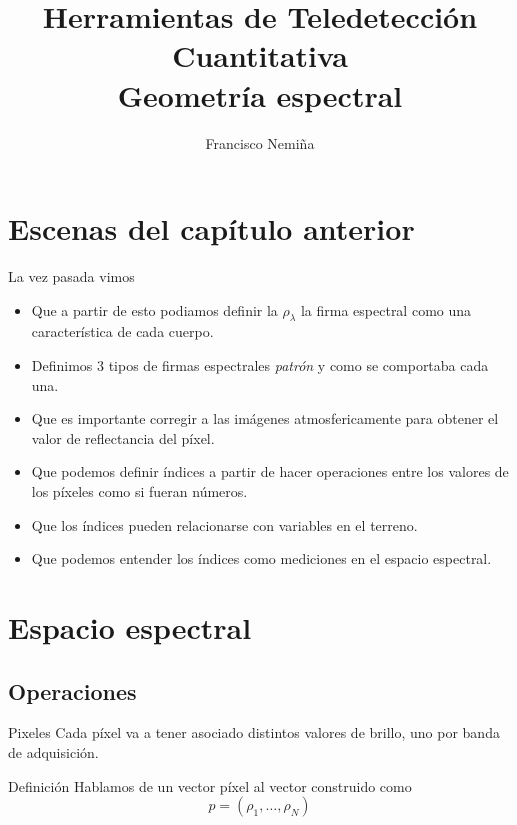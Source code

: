 \documentclass[]{beamer}
\title{Herramientas de Teledetección Cuantitativa\\{\small Geometría espectral}}
\author{Francisco Nemiña}
\institute{Unidad de Educación y Formación Masiva \\
Comisión Nacional de Actividades Espaciales}
\begin{document}
\begin{frame}
    \maketitle
\end{frame}

\section{Escenas del capítulo anterior}
\begin{frame}{La vez pasada vimos}
  \begin{itemize}[<+->]
    \item Que a partir de esto podiamos definir la $\rho_\lambda$ la firma espectral como una característica de cada cuerpo.
    \item Definimos 3 tipos de firmas espectrales \emph{patrón} y como se comportaba cada una.
    \item Que es importante corregir a las imágenes atmosfericamente para obtener el valor de reflectancia del píxel.
    \item Que podemos definir índices a partir de hacer operaciones entre los valores de los píxeles como si fueran números.
    \item Que los índices pueden relacionarse con variables en el terreno.
    \item Que podemos entender los índices como mediciones en el espacio espectral.
  \end{itemize}
\end{frame}

\section{Espacio espectral}
\subsection{Operaciones}
\begin{frame}{Pixeles}
  Cada píxel va a tener asociado distintos valores de brillo, uno por banda de adquisición. \pause
  \begin{block}{Definición}
    Hablamos de un vector píxel al vector construido como
    \begin{equation}
      p = (\rho_1, \ldots ,\rho_N)
    \end{equation}
  \end{block}
\end{frame}
\end{document}
